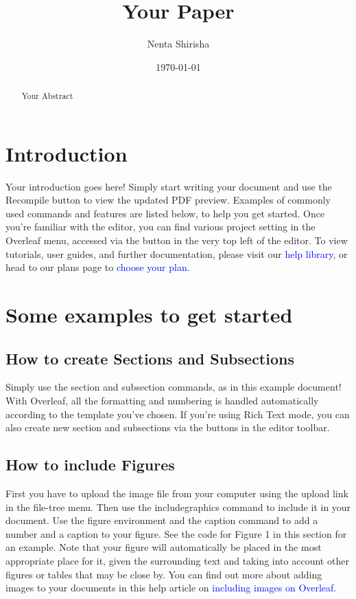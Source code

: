 \documentclass{article}
\title{Your Paper}
\author{Nenta Shirisha}
\date{\today}
\begin{document}
	\maketitle
	
	\begin{abstract}
		Your Abstract
	\end{abstract}

\section{Introduction}
Your introduction goes here! Simply start writing your document and use the Recompile button to
view the updated PDF preview. Examples of commonly used commands and features are listed below,
to help you get started.
Once you’re familiar with the editor, you can find various project setting in the Overleaf menu,
accessed via the button in the very top left of the editor. To view tutorials, user guides, and further
documentation, please visit our {\textcolor{blue}{help library}}, or head to our plans page to {\textcolor{blue}{choose your plan.}}


\section{Some examples to get started}
\subsection{How to create Sections and Subsections}
Simply use the section and subsection commands, as in this example document! With Overleaf, all
the formatting and numbering is handled automatically according to the template you’ve chosen. If
you’re using Rich Text mode, you can also create new section and subsections via the buttons in the
editor toolbar.

\subsection{How to include Figures}
First you have to upload the image file from your computer using the upload link in the file-tree menu.
Then use the includegraphics command to include it in your document. Use the figure environment
and the caption command to add a number and a caption to your figure. See the code for Figure 1 in
this section for an example.
Note that your figure will automatically be placed in the most appropriate place for it, given the
surrounding text and taking into account other figures or tables that may be close by. You can find
out more about adding images to your documents in this help article on {\textcolor{blue}{including images on Overleaf.}}
\end{document}
